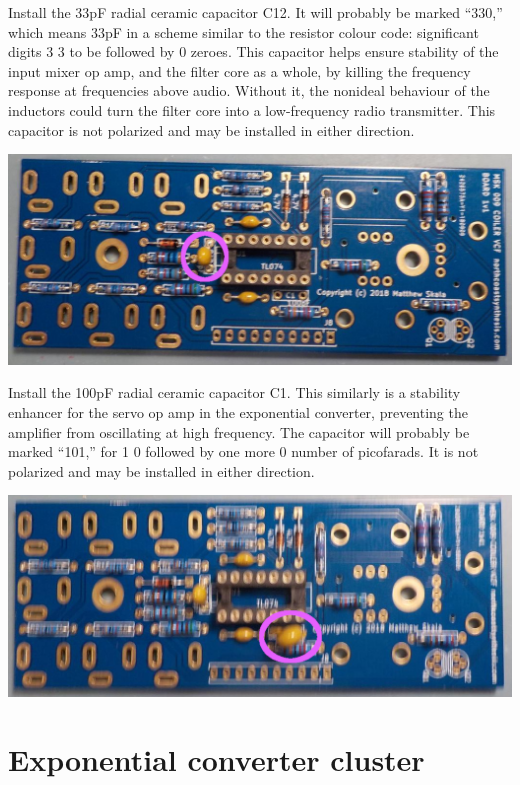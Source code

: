 Install the 33pF radial ceramic capacitor C12.  It will probably be marked
``330,'' which means 33pF in a scheme similar to the resistor colour code:
significant digits 3 3 to be followed by 0 zeroes.  This capacitor helps
ensure stability of the input mixer op amp, and the filter core as a whole,
by killing the frequency response at frequencies above audio.  Without it,
the nonideal behaviour of the inductors could turn the filter core into a
low-frequency radio transmitter.  This capacitor is not polarized and may be
installed in either direction.

\nopagebreak
\noindent\includegraphics[width=\linewidth]{cap-33p.jpg}

Install the 100pF radial ceramic capacitor C1.  This similarly is a
stability enhancer for the servo op amp in the exponential converter,
preventing the amplifier from oscillating at high frequency.  The capacitor
will probably be marked ``101,'' for 1 0 followed by one more 0 number of
picofarads.  It is not polarized and may be installed in either direction.

\nopagebreak
\noindent\includegraphics[width=\linewidth]{cap-100p.jpg}

\pagebreak

\section{Exponential converter cluster}

